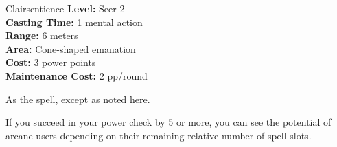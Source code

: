 {Clairsentience}
{
	\textbf{Level:}
	Seer 2\\
	\textbf{Casting Time:}
	1 mental action\\
	\textbf{Range:}
	6 meters\\
	\textbf{Area:}
	Cone-shaped emanation\\
	\textbf{Cost:}
	3 power points\\
	\textbf{Maintenance Cost:}
	2 pp/round\\
}
{
	As the  spell, except as noted here.

	If you succeed in your power check by 5 or more, you can see the potential of arcane users depending on their remaining relative number of spell slots.

}